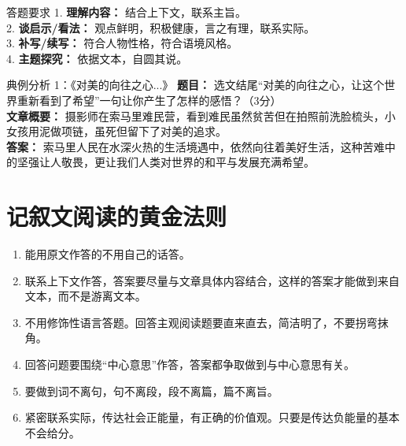\documentclass[11pt, a4paper]{ctexart}
\begin{document}
\begin{tipsbox}{答题要求}
1. \textbf{理解内容：} 结合上下文，联系主旨。\\
2. \textbf{谈启示/看法：} 观点鲜明，积极健康，言之有理，联系实际。\\
3. \textbf{补写/续写：} 符合人物性格，符合语境风格。\\
4. \textbf{主题探究：} 依据文本，自圆其说。
\end{tipsbox}

\begin{examplebox}{典例分析 1：《对美的向往之心...》}
\textbf{题目：} 选文结尾“对美的向往之心，让这个世界重新看到了希望”一句让你产生了怎样的感悟？（3分）\\
\textbf{文章概要：} 摄影师在索马里难民营，看到难民虽然贫苦但在拍照前洗脸梳头，小女孩用泥做项链，虽死但留下了对美的追求。\\
\textbf{答案：} 索马里人民在水深火热的生活境遇中，依然向往着美好生活，这种苦难中的坚强让人敬畏，更让我们人类对世界的和平与发展充满希望。
\end{examplebox}

\section*{记叙文阅读的黄金法则}
\begin{enumerate}
    \item 能用原文作答的不用自己的话答。
    \item 联系上下文作答，答案要尽量与文章具体内容结合，这样的答案才能做到来自文本，而不是游离文本。
    \item 不用修饰性语言答题。回答主观阅读题要直来直去，简洁明了，不要拐弯抹角。
    \item 回答问题要围绕“中心意思”作答，答案都争取做到与中心意思有关。
    \item 要做到词不离句，句不离段，段不离篇，篇不离旨。
    \item 紧密联系实际，传达社会正能量，有正确的价值观。只要是传达负能量的基本不会给分。
\end{enumerate}
\end{document}
